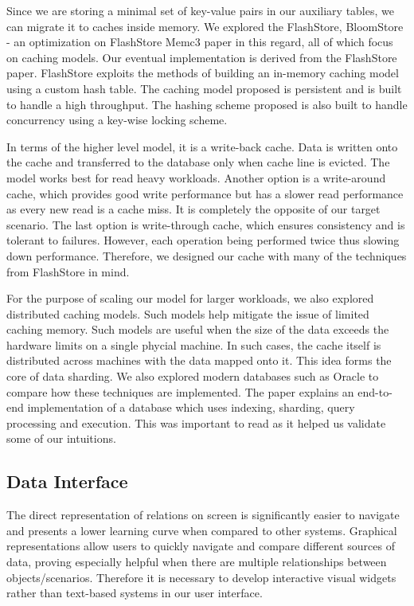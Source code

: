 Since we are storing a minimal set of key-value pairs in our auxiliary tables, we can migrate it to caches inside memory. We explored the FlashStore\cite{FlashStore}\cite{FalshKVStore}, BloomStore - an optimization on FlashStore\cite{BloomStore} Memc3\cite{Memcached} paper in this regard, all of which focus on caching models. Our eventual implementation is derived from the FlashStore\cite{FlashStore} paper. FlashStore exploits the methods of building an in-memory caching model using a custom hash table. The caching model proposed is persistent and is built to handle a high throughput. The hashing scheme proposed is also built to handle concurrency using a key-wise locking scheme. 

In terms of the higher level model, it is a write-back cache. Data is written onto the cache and transferred to the database only when cache line is evicted. The model works best for read heavy workloads. Another option is a write-around cache, which provides good write performance but has a slower read performance as every new read is a cache miss. It is completely the opposite of our target scenario. The last option is write-through cache, which ensures consistency and is tolerant to failures. However, each operation being performed twice thus slowing down performance. Therefore, we designed our cache with many of the techniques from FlashStore in mind.

For the purpose of scaling our model for larger workloads, we also explored distributed caching models\cite{DistibutedCaching}. Such models help mitigate the issue of limited caching memory. Such models are useful when the size of the data exceeds the hardware limits on a single phycial machine. In such cases, the cache itself is distributed across machines with the data mapped onto it. This idea forms the core of data sharding. We also explored modern databases such as Oracle\cite{Oracle} to compare how these techniques are implemented. The paper explains an end-to-end implementation of a database which uses indexing, sharding, query processing and execution. This was important to read as it helped us validate some of our intuitions.

\subsection{Data Interface}
The direct representation of relations on screen is significantly easier to navigate and presents a lower learning curve when compared to other systems. Graphical representations allow users to quickly navigate and compare different sources of data, proving especially helpful when there are multiple relationships between objects/scenarios.\cite{DirectManipulation}\cite{DataSplash} Therefore it is necessary to develop interactive visual widgets rather than text-based systems in our user interface.

